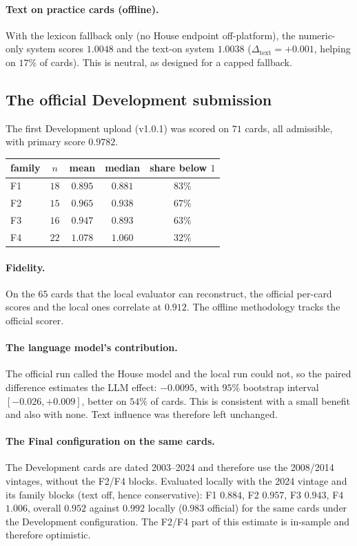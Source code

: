 \paragraph{Text on practice cards (offline).} With the lexicon fallback only (no House endpoint off-platform), the numeric-only system scores
$1.0048$ and the text-on system $1.0038$ ($\Delta_{\text{text}}=+0.001$, helping on $17\%$ of cards). This is neutral, as designed for a capped fallback.

\subsection{The official Development submission}

The first Development upload (v1.0.1) was scored on $71$ cards, all admissible, with primary score $\mathbf{0.9782}$.
\begin{center}
\begin{tabular}{lcccc}
\toprule
family & $n$ & mean & median & share below $1$\\
\midrule
F1 & $18$ & $0.895$ & $0.881$ & $83\%$\\
F2 & $15$ & $0.965$ & $0.938$ & $67\%$\\
F3 & $16$ & $0.947$ & $0.893$ & $63\%$\\
F4 & $22$ & $1.078$ & $1.060$ & $32\%$\\
\bottomrule
\end{tabular}
\end{center}
\paragraph{Fidelity.} On the $65$ cards that the local evaluator can reconstruct, the official per-card scores and the local ones correlate at
$0.912$. The offline methodology tracks the official scorer.

\paragraph{The language model's contribution.} The official run called the House model and the local run could not, so the paired difference estimates
the LLM effect: $-0.0095$, with $95\%$ bootstrap interval $[-0.026,+0.009]$, better on $54\%$ of cards. This is consistent with a small benefit and
also with none. Text influence was therefore left unchanged.

\paragraph{The Final configuration on the same cards.} The Development cards are dated 2003--2024 and therefore use the 2008/2014 vintages, without the
F2/F4 blocks. Evaluated locally with the 2024 vintage and its family blocks (text off, hence conservative):
F1 $0.884$, F2 $0.957$, F3 $0.943$, F4 $1.006$, overall $\mathbf{0.952}$ against $0.992$ locally ($0.983$ official) for the same cards under the Development configuration. The F2/F4
part of this estimate is in-sample and therefore optimistic.

